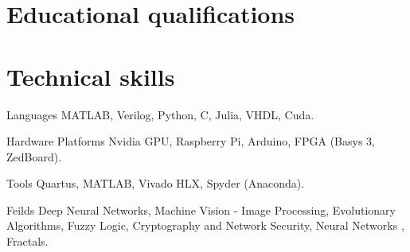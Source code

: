 \documentclass[fontsize=11pt]{tccv}
\begin{document}
\section{Educational qualifications}
\begin{table}[!h]
\centering
{\renewcommand{\arraystretch}{1.1}
	}
\end{table}
\vspace{1em}
\section{Technical skills}
\begin{factlist}
\item{Languages}
     {MATLAB, Verilog, Python, C, Julia, VHDL, Cuda.}
 \item{Hardware Platforms }   
 {Nvidia GPU, Raspberry Pi, Arduino, FPGA (Basys 3, ZedBoard).}
\item{Tools}
     {Quartus, MATLAB, Vivado HLX, Spyder (Anaconda).}
\item{Feilds}
     {Deep Neural Networks, Machine Vision - Image Processing, Evolutionary Algorithms, Fuzzy Logic, Cryptography and Network Security, Neural Networks , Fractals.}     
\end{factlist}
\end{document}

